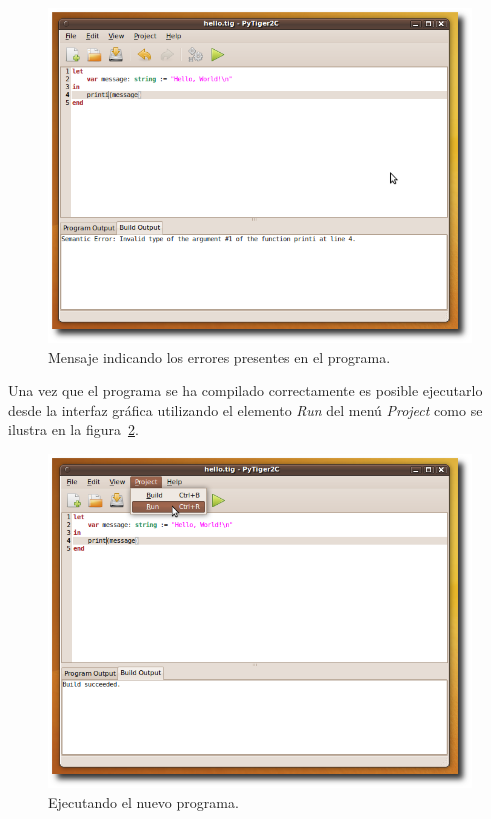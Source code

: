 \documentclass{article}
\begin{document}
\begin{figure}[htb]
  \centering
  \includegraphics[width=5.5in]{gui/7-build-errors}
  \caption{Mensaje indicando los errores presentes en el programa.}
  \label{fig:7-build-errors}
\end{figure}

\newpage

Una vez que el programa se ha compilado correctamente es posible ejecutarlo
desde la interfaz gráfica utilizando el elemento \emph{Run} del menú
\emph{Project} como se ilustra en la figura~\ref{fig:8-running}.

\begin{figure}[htb]
  \centering
  \includegraphics[width=5.5in]{gui/8-running}
  \caption{Ejecutando el nuevo programa.}
  \label{fig:8-running}
\end{figure}
\end{document}
